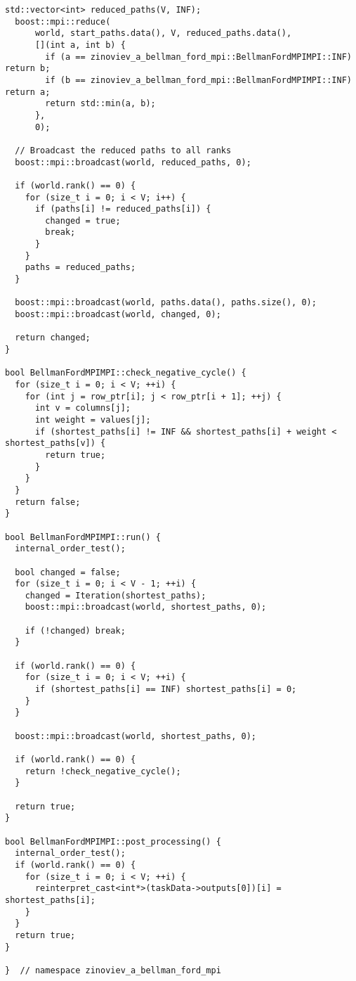 \documentclass[12pt]{article}
\begin{document}
\begin{lstlisting}[caption={ops\_mpi\_.cpp}]
  std::vector<int> reduced_paths(V, INF);
  boost::mpi::reduce(
      world, start_paths.data(), V, reduced_paths.data(),
      [](int a, int b) {
        if (a == zinoviev_a_bellman_ford_mpi::BellmanFordMPIMPI::INF) return b;
        if (b == zinoviev_a_bellman_ford_mpi::BellmanFordMPIMPI::INF) return a;
        return std::min(a, b);
      },
      0);

  // Broadcast the reduced paths to all ranks
  boost::mpi::broadcast(world, reduced_paths, 0);

  if (world.rank() == 0) {
    for (size_t i = 0; i < V; i++) {
      if (paths[i] != reduced_paths[i]) {
        changed = true;
        break;
      }
    }
    paths = reduced_paths;
  }

  boost::mpi::broadcast(world, paths.data(), paths.size(), 0);
  boost::mpi::broadcast(world, changed, 0);

  return changed;
}

bool BellmanFordMPIMPI::check_negative_cycle() {
  for (size_t i = 0; i < V; ++i) {
    for (int j = row_ptr[i]; j < row_ptr[i + 1]; ++j) {
      int v = columns[j];
      int weight = values[j];
      if (shortest_paths[i] != INF && shortest_paths[i] + weight < shortest_paths[v]) {
        return true;
      }
    }
  }
  return false;
}

bool BellmanFordMPIMPI::run() {
  internal_order_test();

  bool changed = false;
  for (size_t i = 0; i < V - 1; ++i) {
    changed = Iteration(shortest_paths);
    boost::mpi::broadcast(world, shortest_paths, 0);

    if (!changed) break;
  }

  if (world.rank() == 0) {
    for (size_t i = 0; i < V; ++i) {
      if (shortest_paths[i] == INF) shortest_paths[i] = 0;
    }
  }

  boost::mpi::broadcast(world, shortest_paths, 0);

  if (world.rank() == 0) {
    return !check_negative_cycle();
  }

  return true;
}

bool BellmanFordMPIMPI::post_processing() {
  internal_order_test();
  if (world.rank() == 0) {
    for (size_t i = 0; i < V; ++i) {
      reinterpret_cast<int*>(taskData->outputs[0])[i] = shortest_paths[i];
    }
  }
  return true;
}

}  // namespace zinoviev_a_bellman_ford_mpi
\end{lstlisting}

\newpage
\end{document}
